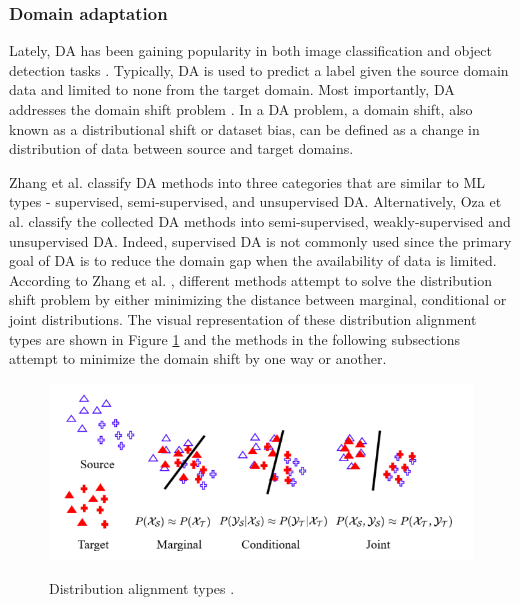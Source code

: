 

\subsubsection{Domain adaptation}
\label{DA_section} 
Lately, DA has been gaining popularity in both image classification and object detection tasks \cite{Zhang2021}. Typically, DA is used to predict a label given the source domain data and limited to none from the target domain. Most importantly, DA addresses the domain shift problem \cite{Zhang2021}. In a DA problem, a domain shift, also known as a distributional shift or dataset bias, can be defined as a change in distribution of data between source and target domains. 


Zhang et al. \cite{Zhang2021} classify DA methods into three categories that are similar to ML types - supervised, semi-supervised, and unsupervised DA. Alternatively, Oza et al. \cite{Oza2021} classify the collected DA methods into semi-supervised, weakly-supervised and unsupervised DA. Indeed, supervised DA is not commonly used since the primary goal of DA is to reduce the domain gap when the availability of data is limited. 
According to Zhang et al. \cite{Zhang2021}, different methods attempt to solve the distribution shift problem by either minimizing the distance between marginal, conditional or joint distributions. The visual representation of these distribution alignment types are shown in Figure \ref{distribution} and the methods in the following subsections attempt to minimize the domain shift by one way or another. 

\begin{figure}[htb]
	\begin{center}
		\includegraphics[width=12cm]{./distribution.png}
	\end{center}
	\caption{Distribution alignment types \cite{Zhang2021}.}
	\begin{center}
		\label{distribution}
	\end{center}
\end{figure}
\FloatBarrier 



